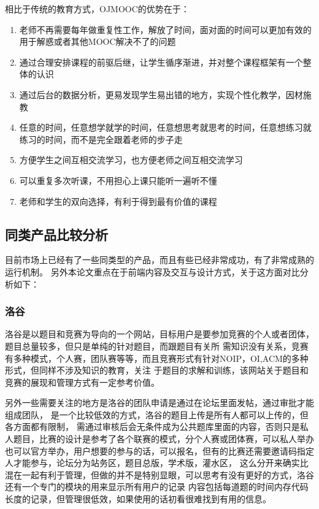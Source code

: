 \documentclass[UTF8,10pt,a4paper]{ctexart}
\begin{document}
     相比于传统的教育方式，OJMOOC的优势在于：
     \begin{enumerate}
       \item 老师不再需要每年做重复性工作，解放了时间，面对面的时间可以更加有效的用于解惑或者其他MOOC解决不了的问题
       \item 通过合理安排课程的前驱后继，让学生循序渐进，并对整个课程框架有一个整体的认识
       \item 通过后台的数据分析，更易发现学生易出错的地方，实现个性化教学，因材施教
       \item 任意的时间，任意想学就学的时间，任意想思考就思考的时间，任意想练习就练习的时间，而不是完全跟着老师的步子走
       \item 方便学生之间互相交流学习，也方便老师之间互相交流学习
       \item 可以重复多次听课，不用担心上课只能听一遍听不懂
       \item 老师和学生的双向选择，有利于得到最有价值的课程
     \end{enumerate}

  \subsection{同类产品比较分析}
  目前市场上已经有了一些同类型的产品，而且有些已经非常成功，有了非常成熟的运行机制。
  另外本论文重点在于前端内容及交互与设计方式，关于这方面对比分析如下：

     \subsubsection{洛谷}
     洛谷是以题目和竞赛为导向的一个网站，目标用户是要参加竞赛的个人或者团体，题目总量较多，但只是单纯的针对题目，而跟题目有关所 需知识没有关系，竞赛有多种模式，个人赛，团队赛等等，而且竞赛形式有针对NOIP，OI,ACM的多种形式，但同样不涉及知识的教育，关注 于题目的求解和训练，该网站关于题目和竞赛的展现和管理方式有一定参考价值。

     另外一些需要关注的地方是洛谷的团队申请是通过在论坛里面发帖，通过审批才能组成团队，
     是一个比较低效的方式，洛谷的题目上传是所有人都可以上传的，但各方面都有限制，
     需通过审核后会无条件成为公共题库里面的内容，否则只是私人题目，比赛的设计是参考了各个联赛的模式，分个人赛或团体赛，可以私人举办
     也可以官方举办，用户想要的参与的话，可以报名，但有的比赛还需要邀请码指定人才能参与，论坛分为站务区，题目总版，学术版，灌水区，
     这么分开来确实比混在一起有利于管理，但做的并不是特别显眼，可以思考有没有更好的方式，洛谷还有一个专门的模块的用来显示所有用户的记录
     内容包括每道题的时间内存代码长度的记录，但管理很低效，如果使用的话初看很难找到有用的信息。
\end{document}
